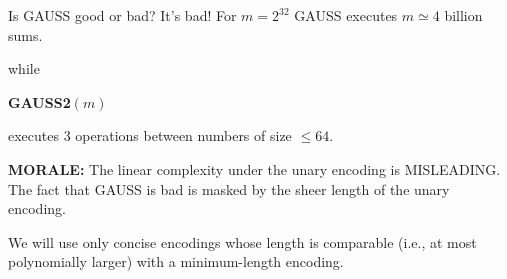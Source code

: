
Is GAUSS good or bad?
It's bad! For $m=2^{32}$ GAUSS executes $m\simeq4$ billion sums.

while

\begin{notesalgorithm}
\textbf{GAUSS2$(m)$}
\begin{notespseudocode}
\end{notespseudocode}
\end{notesalgorithm}
executes 3 operations between numbers of size $\leq64$.

\textbf{MORALE:} The linear complexity under the unary encoding is MISLEADING. The fact that GAUSS is bad is masked by the sheer length of the unary encoding.

We will use only concise encodings whose length is comparable (i.e., at most polynomially larger) with a minimum-length encoding.
